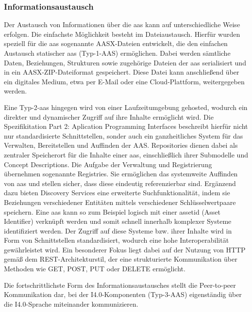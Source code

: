 \subsubsection{Informationsaustausch}
Der Austausch von Informationen über die \acs{aas} kann auf unterschiedliche Weise erfolgen.
Die einfachste Möglichkeit besteht im Dateiaustausch. Hierfür wurden speziell für die \acs{aas} sogenannte AASX-Dateien \cite{SpezifikationPart5} entwickelt, die den einfachen Austausch statischer \acs{aas} (Typ-1-AAS) ermöglichen.
Dabei werden sämtliche Daten, Beziehungen, Strukturen sowie zugehörige Dateien der \acs{aas} serialisiert und in ein AASX-ZIP-Dateiformat gespeichert. 
Diese Datei kann anschließend über ein digitales Medium, etwa per E-Mail oder eine Cloud-Plattform, weitergegeben werden. 

Eine Typ-2-\acs{aas} hingegen wird von einer Laufzeitumgebung gehosted, wodurch ein direkter und dynamischer Zugriff auf ihre Inhalte ermöglicht wird. 
Die Spezifikitation Part 2: Aplication Programming Interfaces \cite{SpezifikationPart2} beschreibt hierfür nicht nur standardisierte Schnittstellen, sonder auch ein ganzheitliches System für das Verwalten, Bereitstellen und Auffinden der AAS.
Repositories dienen dabei als zentraler Speicherort für die Inhalte einer \acs{aas}, einschließlich ihrer Submodelle und Concept Descriptions.
Die Aufgabe der Verwaltung und Registrierung übernehmen sogenannte Registries.
Sie ermöglichen das systemweite Auffinden von \acs{aas} und stellen sicher, dass diese eindeutig referenzierbar sind.
Ergänzend dazu bieten Discovery Services eine erweiterte Suchfunktionalität, indem sie Beziehungen verschiedener Entitäten mittels verschiedener Schlüsselwertpaare speichern.
Eine \acs{aas} kann so zum Beispiel logisch mit einer \acs{assetid} (Asset Identifier) verknüpft werden und somit schnell innerhalb komplexer Systeme identifiziert werden.
Der Zugriff auf diese Systeme bzw. ihrer Inhalte wird in Form von Schnittstellen standardisiert, wodurch eine hohe Interoperabilität gewährleistet wird.
Ein besonderer Fokus liegt dabei auf der Nutzung von HTTP gemäß dem REST-Architekturstil, der eine strukturierte Kommunikation über Methoden wie GET, POST, PUT oder DELETE ermöglicht.

Die fortschrittlichste Form des Informationsaustausches stellt die Peer-to-peer Kommunikation dar, bei der I4.0-Komponenten (Typ-3-AAS) eigenständig über die I4.0-Sprache miteinander kommunizieren.



